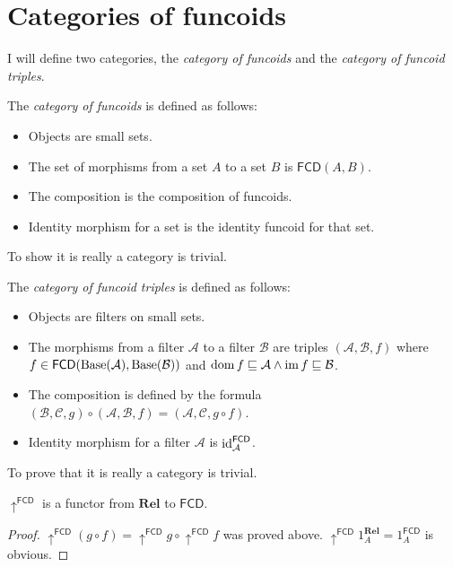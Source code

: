 \section{Categories of funcoids}

I will define two categories, the \emph{category of funcoids} and
the \emph{category of funcoid triples}.

The \emph{category of funcoids} is defined
as follows:
\begin{itemize}
\item Objects are small sets.
\item The set of morphisms from a set $A$ to a set $B$ is $\mathsf{FCD}(A,B)$.
\item The composition is the composition of funcoids.
\item Identity morphism for a set is the identity funcoid for that set.
\end{itemize}
To show it is really a category is trivial.

The \emph{category of funcoid
triples} is defined as follows:
\begin{itemize}
\item Objects are filters on small sets.
\item The morphisms from a filter $\mathcal{A}$ to a filter $\mathcal{B}$
are triples $(\mathcal{A},\mathcal{B},f)$ where
$f\in\mathsf{FCD}(\operatorname{Base}(\mathcal{A}),\operatorname{Base}(\mathcal{B}))$
and $\operatorname{dom} f\sqsubseteq\mathcal{A}\land\operatorname{im} f\sqsubseteq\mathcal{B}$.
\item The composition is defined by the formula
$(\mathcal{B},\mathcal{C},g)\circ(\mathcal{A},\mathcal{B},f)=(\mathcal{A}
,\mathcal{C},g\circ f)$.
\item Identity morphism for a filter $\mathcal{A}$ is
$\operatorname{id}_{\mathcal{A}}^{\mathsf{FCD}}$.
\end{itemize}
To prove that it is really a category is trivial.
\begin{prop}
$\uparrow^{\mathsf{FCD}}$ is a functor from $\mathbf{Rel}$ to
$\mathsf{FCD}$.\end{prop}
\begin{proof}
$\uparrow^{\mathsf{FCD}}(g\circ
f)=\uparrow^{\mathsf{FCD}}g\circ\uparrow^{\mathsf{FCD}}f$
was proved above.
$\uparrow^{\mathsf{FCD}}1_{A}^{\mathbf{Rel}}=1_{A}^{\mathsf{FCD}}$
is obvious.
\end{proof}
